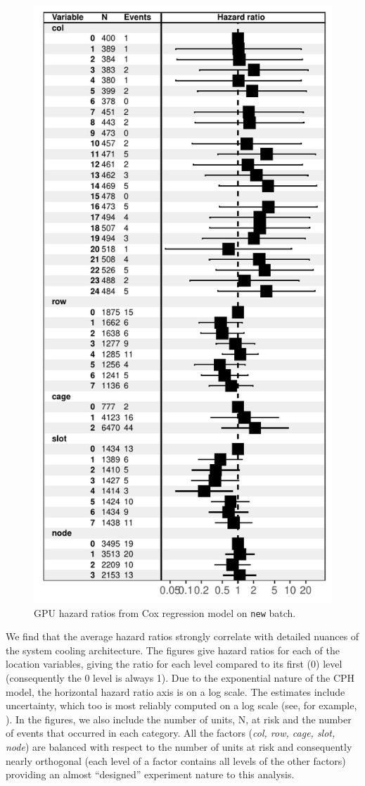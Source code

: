 \begin{figure}
  \centering
  \includegraphics[width=0.8\columnwidth]{figs/cox_n001.pdf}
  \caption{GPU hazard ratios from Cox regression model on {\tt new}
    batch.}
  \label{fig:cox-new}
\end{figure}

We find that the average hazard ratios strongly correlate with
detailed nuances of the system cooling architecture.  The figures give
hazard ratios for each of the location variables, giving the ratio for
each level compared to its first (0) level (consequently the 0 level
is always 1). Due to the exponential nature of the CPH model, the
horizontal hazard ratio axis is on a log scale. The estimates include
uncertainty, which too is most reliably computed on a log scale (see,
for example, \cite{Ostrouchov88}). In the figures, we also include the
number of units, N, at risk and the number of events that occurred in
each category. All the factors ({\em col, row, cage, slot, node}) are
balanced with respect to the number of units at risk and consequently
nearly orthogonal (each level of a factor contains all levels of the
other factors) providing an almost ``designed'' experiment nature to
this analysis.

